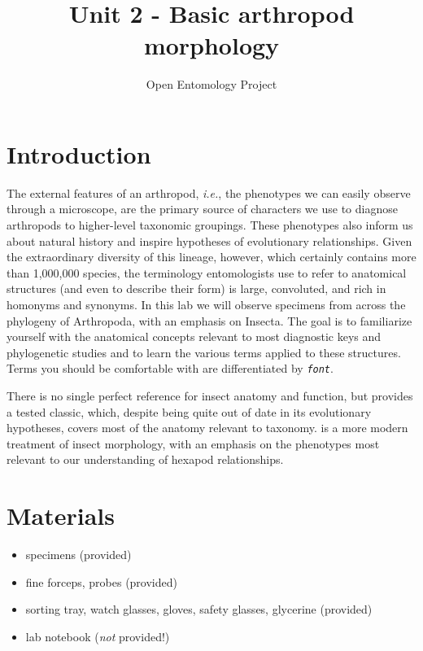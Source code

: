 \documentclass[letterpaper, 11pt]{article}
\title{Unit 2 - Basic arthropod morphology}
\author{Open Entomology Project}
\newcommand{\latinword}[1]{\texttt{\itshape #1}}%
\begin{document}
\cleanlookdateon %
\maketitle
\thispagestyle{fancy}
\section*{Introduction}
The external features of an arthropod, \textit{i.e.}, the phenotypes we can easily observe through a microscope, are the primary source of characters we use to diagnose arthropods to higher-level taxonomic groupings. These phenotypes also inform us about natural history and inspire hypotheses of evolutionary relationships. Given the extraordinary diversity of this lineage, however, which certainly contains more than 1,000,000 species, the terminology entomologists use to refer to anatomical structures (and even to describe their form) is large, convoluted, and rich in homonyms and synonyms. In this lab we will observe specimens from across the phylogeny of Arthropoda, with an emphasis on Insecta. The goal is to familiarize yourself with the anatomical concepts relevant to most diagnostic keys and phylogenetic studies and to learn the various terms applied to these structures. Terms you should be comfortable with are differentiated by \latinword{font}.

There is no single perfect reference for insect anatomy and function, but \cite{snodgrass1935principles} provides a tested classic, which, despite being quite out of date in its evolutionary hypotheses, covers most of the anatomy relevant to taxonomy. \cite{beutel2013insect} is a more modern treatment of insect morphology, with an emphasis on the phenotypes most relevant to our understanding of hexapod relationships.

\section*{Materials}
\begin{itemize}
	\item {specimens (provided)}
	\item {fine forceps, probes (provided)}
	\item {sorting tray, watch glasses, gloves, safety glasses, glycerine (provided)}
	\item {lab notebook (\textit{not} provided!)}
\end{itemize}
\end{document}
